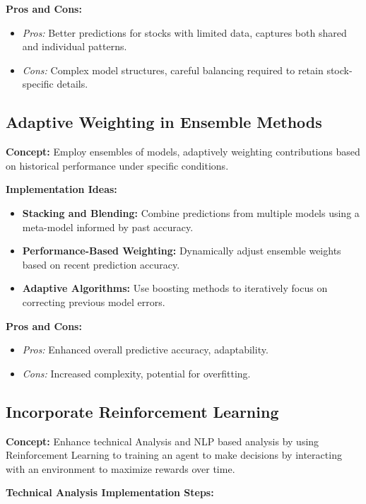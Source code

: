 \documentclass[twocolumn]{article}
\begin{document}
\textbf{Pros and Cons:}
\begin{itemize}
    \item \textit{Pros:} Better predictions for stocks with limited data, captures both shared and individual patterns.
    \item \textit{Cons:} Complex model structures, careful balancing required to retain stock-specific details.
\end{itemize}

\subsection{Adaptive Weighting in Ensemble Methods}

\textbf{Concept:} 
Employ ensembles of models, adaptively weighting contributions based on historical performance under specific conditions.

\textbf{Implementation Ideas:}

\begin{itemize}
    \item \textbf{Stacking and Blending:} Combine predictions from multiple models using a meta-model informed by past accuracy.
    \item \textbf{Performance-Based Weighting:} Dynamically adjust ensemble weights based on recent prediction accuracy.
    \item \textbf{Adaptive Algorithms:} Use boosting methods to iteratively focus on correcting previous model errors.
\end{itemize}

\textbf{Pros and Cons:}
\begin{itemize}
    \item \textit{Pros:} Enhanced overall predictive accuracy, adaptability.
    \item \textit{Cons:} Increased complexity, potential for overfitting.
\end{itemize}

\subsection{Incorporate Reinforcement Learning}

\textbf{Concept:} 
Enhance technical Analysis and NLP based analysis by using Reinforcement Learning to training an agent to make decisions by interacting with an environment to maximize rewards over time.

\textbf{Technical Analysis Implementation Steps:}
\end{document}
